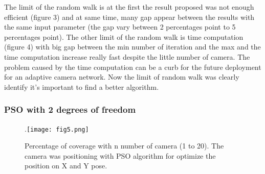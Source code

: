  The limit of the random walk is at the first the result proposed was not enough efficient (figure 3) and at same time, many gap appear between the results with the same input parameter (the gap vary between 2 percentages point to 5 percentages point). The other limit of the random walk is time computation (figure 4) with big gap between the min number of iteration and the max and the time computation increase really fast despite the little number of camera. The problem caused by the time computation can be a curb for the future deployment for an adaptive camera network. Now the limit of random walk was clearly identify it’s important to find a better algorithm.  
 
\subsubsection{PSO with 2 degrees of freedom}\label{subsec:311}

\begin{figure}
  \centering
  \hspace*{\fill}
	.\texttt{[image: fig5.png]}
  \hspace*{\fill}
  \caption{%
	Percentage of coverage with n number of camera (1 to 20). The camera was positioning with PSO algorithm for optimize the position on X and Y pose.  }
  \label{fig:422}
\end{figure}

